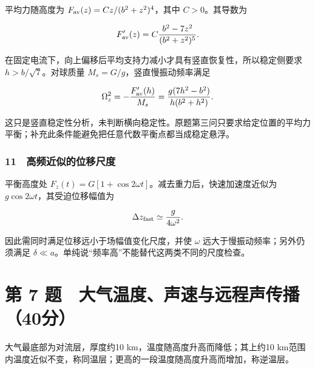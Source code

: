 \documentclass[12pt,a4paper,fontset=fandol]{ctexart}
\begin{document}
平均力随高度为 \(F_{\rm av}(z)=Cz/(b^2+z^2)^4\)，其中 \(C>0\)。其导数为

\[F'_{\rm av}(z)=C\frac{b^2-7z^2}{(b^2+z^2)^5}.\]

在固定电流下，向上偏移后平均支持力减小才具有竖直恢复性，所以稳定侧要求
\(h>b/\sqrt7\)。对球质量 \(M_s=G/g\)，竖直慢振动频率满足

\[\Omega_z^2=-\frac{F'_{\rm av}(h)}{M_s}
=\frac{g(7h^2-b^2)}{h(b^2+h^2)}.\]

这只是竖直稳定性分析，未判断横向稳定性。原题第三问只要求给定位置的平均力平衡；补充此条件能避免把任意代数平衡点都当成稳定悬浮。

\subsubsection{11　高频近似的位移尺度}\label{ux9ad8ux9891ux8fd1ux4f3cux7684ux4f4dux79fbux5c3aux5ea6}

平衡高度处 \(F_z(t)=G[1+\cos2\omega t]\)。减去重力后，快速加速度近似为
\(g\cos2\omega t\)，其受迫位移幅值为

\[\Delta z_{\rm fast}\simeq\frac g{4\omega^2}.\]

因此需同时满足位移远小于场幅值变化尺度，并使 \(\omega\)
远大于慢振动频率；另外仍须满足
\(\delta\ll a\)。单纯说``频率高''不能替代这两类不同的尺度检查。

\clearpage

\section{第 7
题　大气温度、声速与远程声传播（40分）}\label{ux7b2c-7-ux9898-ux5927ux6c14ux6e29ux5ea6ux58f0ux901fux4e0eux8fdcux7a0bux58f0ux4f20ux64ad40ux5206}

大气最底部为对流层，厚度约10 km，温度随高度升高而降低；其上约10
km范围内温度近似不变，称同温层；更高的一段温度随高度升高而增加，称逆温层。

\begin{center}
\begin{minipage}{\linewidth}
\centering\begingroup{}
\ifdim\wd\diagrambox>.88\linewidth
\sbox{\diagrambox}{\resizebox{.88\linewidth}{!}{\usebox{\diagrambox}}}\fi
\ifdim\ht\diagrambox>.38\textheight
\resizebox{!}{.38\textheight}{\usebox{\diagrambox}}
\else\usebox{\diagrambox}\fi
\par{}\endgroup\end{minipage}\end{center}
\end{document}
